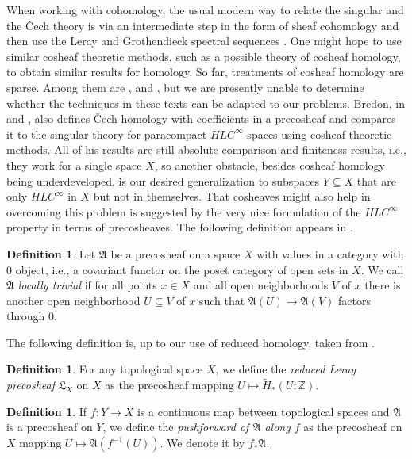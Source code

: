 \documentclass{amsart}
\theoremstyle{plain}
\theoremstyle{definition}
\newtheorem{defi}[thm]{Definition}
\begin{document}
When working with cohomology, the usual modern way to relate the singular and the \v{C}ech theory is via an intermediate step in the form of sheaf cohomology and then use the Leray and Grothendieck spectral sequences \cite[Chapter III]{MR1481706}. One might hope to use similar cosheaf theoretic methods, such as a possible theory of cosheaf homology, to obtain similar results for homology. So far, treatments of cosheaf homology are sparse. Among them are \cite{Andreotti.1973}, \cite{Schneiders.1987} and \cite{prasolov2018cosheaves}, but we are presently unable to determine whether the techniques in these texts can be adapted to our problems. Bredon, in \cite{Bredon.1968} and \cite[Chapter VI]{MR1481706}, also defines \v{C}ech homology with coefficients in a precosheaf and compares it to the singular theory for paracompact $HLC^{\infty}$-spaces \cite[Section VI.4 and Theorem VI.12.6]{MR1481706} using cosheaf theoretic methods. All of his results are still absolute comparison and finiteness results, i.e., they work for a single space $X$, so another obstacle, besides cosheaf homology being underdeveloped, is our desired generalization to subspaces $Y\subseteq X$ that are only $HLC^{\infty}$ in $X$ but not in themselves. That cosheaves might also help in overcoming this problem is suggested by the very nice formulation of the $HLC^{\infty}$ property in terms of precosheaves. The following definition appears in \cite{MR1481706}.

\begin{defi}
Let $\mathfrak{A}$ be a precosheaf on a space $X$ with values in a category with 0 object, i.e., a covariant functor on the poset category of open sets in $X$. We call $\mathfrak{A}$ \emph{locally trivial} if for all points $x\in X$ and all open neighborhoods $V$ of $x$ there is another open neighborhood $U\subseteq V$ of $x$ such that $\mathfrak{A}(U)\to\mathfrak{A}(V)$ factors through 0.
\end{defi}

The following definition is, up to our use of reduced homology, taken from \cite{Curry.2015}.

\begin{defi}
For any topological space $X$, we define the \emph{reduced Leray precosheaf} $\mathfrak{L}_X$ on $X$ as the precosheaf mapping $U\mapsto \tilde{H}_*(U;\mathbb{Z})$.
\end{defi}

\begin{defi}
If $f\colon Y\to X$ is a continuous map between topological spaces and $\mathfrak{A}$ is a precosheaf on $Y$, we define the \emph{pushforward of $\mathfrak{A}$ along $f$} as the precosheaf on $X$ mapping $U\mapsto\mathfrak{A}(f^{-1}(U))$. We denote it by $f_*\mathfrak{A}$.
\end{defi}
\end{document}
